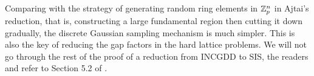 \documentclass[../main.tex]{subfiles}
\begin{document}
Comparing with the strategy of generating random ring elements in $\mathbb{Z}_p^n$ in Ajtai's reduction, that is, constructing a large fundamental region then cutting it down gradually, the discrete Gaussian sampling mechanism is much simpler. This is also the key of reducing the gap factors in the hard lattice problems. We will not go through the rest of the proof of a reduction from INCGDD to SIS, the readers and refer to Section 5.2 of \citep{micciancio07worst}. 


%
%
\end{document}
